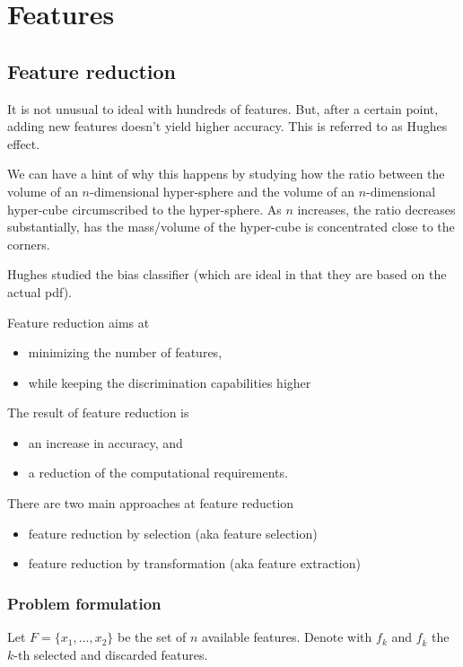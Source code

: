 \documentclass[oneside,onecolumn]{report}
\begin{document}
\clearpage
\chapter{Features}
\section{Feature reduction}
It is not unusual to ideal with hundreds of features.
But, after a certain point, adding new features doesn't yield higher accuracy.
This is referred to as Hughes effect.

We can have a hint of why this happens by studying how the ratio between the volume of an $n$-dimensional hyper-sphere and the volume of an $n$-dimensional hyper-cube circumscribed to the hyper-sphere.
As $n$ increases, the ratio decreases substantially, has the mass/volume of the hyper-cube is concentrated close to the corners.

Hughes studied the bias classifier (which are ideal in that they are based on the actual pdf).

Feature reduction aims at
\begin{itemize}
    \item minimizing the number of features,
    \item while keeping the discrimination capabilities higher
\end{itemize}

The result of feature reduction is
\begin{itemize}
    \item an increase in accuracy, and
    \item a reduction of the computational requirements.
\end{itemize}

There are two main approaches at feature reduction
\begin{itemize}
    \item feature reduction by selection (aka feature selection)
    \item feature reduction by transformation (aka feature extraction)
\end{itemize}

\subsection{Problem formulation}
Let $F = \{ x_1, \dots, x_2 \}$ be the set of $n$ available features.
Denote with $f_k$ and $f_{\overline k}$ the $k$-th selected and discarded features.
\end{document}

